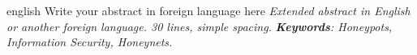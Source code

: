 \par

\begin{resumo}[Abstract]
\begin{otherlanguage*}{english}
Write your abstract in foreign language here
\emph{
Extended abstract in English or another foreign language. 30 lines, simple spacing.
}
\vspace{\onelineskip}
\noindent
\emph{
\textbf{Keywords}: Honeypots, Information Security, Honeynets.
}
\end{otherlanguage*}
\end{resumo}
